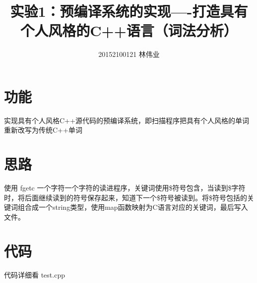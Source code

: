 \documentclass[]{article}
\title{实验1：预编译系统的实现----打造具有个人风格的C++语言（词法分析）}
\author{20152100121 林伟业}
\date{}
\begin{document}
\maketitle


\section{功能}
实现具有个人风格C++源代码的预编译系统，即扫描程序把具有个人风格的单词重新改写为传统C++单词

\section{思路}

使用 fgetc 一个字符一个字符的读进程序，关键词使用\$符号包含，当读到\$字符时，将后面继续读到的符号保存起来，知道下一个\$符号被读到。将\$符号包括的关键词组合成一个string类型，使用map函数映射为C语言对应的关键词，最后写入文件。

\section{代码}

代码详细看 test.cpp
\end{document}
